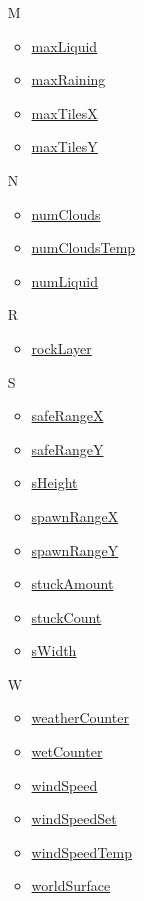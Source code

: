\begin{multicols}{2}[]
{\begin{itemize}
\begin{itemize}
	\item \hyperref[tab9]{LogicCheckScreenWidth}
	\end{itemize}
\item[M] \begin{itemize}
	\item \hyperref[tab10]{maxLiquid}
	\item \href{https://www.bbstr.net/threads/133/#post-623}{maxRaining}
	\item \hyperref[tab8]{maxTilesX}
	\item \hyperref[tab8]{maxTilesY}
	\end{itemize}
\item[N] \begin{itemize}
	\item \href{https://www.bbstr.net/threads/133/#post-623}{numClouds}
	\item \href{https://www.bbstr.net/threads/133/#post-623}{numCloudsTemp}
	\item \hyperref[tab10]{numLiquid}
	\end{itemize}
\item[R] \begin{itemize}
	\item \hyperref[tab8]{rockLayer}
	\end{itemize}
\item[S] \begin{itemize}
	\item \hyperref[tab4618]{safeRangeX}
	\item \hyperref[tab4618]{safeRangeY}
	\item \hyperref[tab9]{sHeight}
	\item \hyperref[tab4618]{spawnRangeX}
	\item \hyperref[tab4618]{spawnRangeY}
	\item \hyperref[tab10]{stuckAmount}
	\item \hyperref[tab10]{stuckCount}
	\item \hyperref[tab9]{sWidth}
	\end{itemize}
\item[W] \begin{itemize}
	\item \href{https://www.bbstr.net/threads/133/#post-623}{weatherCounter}
	\item \hyperref[tab10]{wetCounter}
	\item \href{https://www.bbstr.net/threads/133/#post-623}{windSpeed}
	\item \href{https://www.bbstr.net/threads/133/#post-623}{windSpeedSet}
	\item \href{https://www.bbstr.net/threads/133/#post-623}{windSpeedTemp}
	\item \hyperref[tab8]{worldSurface}
	\end{itemize}
\end{itemize}
}
\end{multicols}

